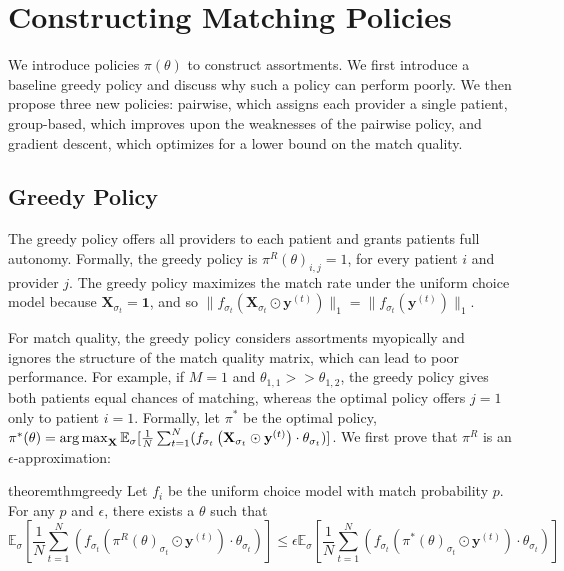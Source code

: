 \section{Constructing Matching Policies}
\label{sec:policies}
We introduce policies $\pi(\theta)$ to construct assortments. 
We first introduce a baseline greedy policy and discuss why such a policy can perform poorly. 
We then propose three new policies: pairwise, which assigns each provider a single patient, group-based, which improves upon the weaknesses of the pairwise policy, and gradient descent, which optimizes for a lower bound on the match quality. 

\subsection{Greedy Policy}
\label{sec:greedy}
The greedy policy offers all providers to each patient and grants patients full autonomy. 
Formally, the greedy policy is $\pi^{R}(\theta)_{i,j} = 1$, for every patient $i$ and provider $j$. 
The greedy policy maximizes the match rate under the uniform choice model because $\mathbf{X}_{\sigma_{t}} = \mathbf{1}$, and so $\lVert f_{\sigma_{t}}(\mathbf{X}_{\sigma_{t}} \odot \mathbf{y}^{(t)})\rVert_{1} = \lVert f_{\sigma_{t}}(\mathbf{y}^{(t)}) \rVert_{1}$.

For match quality, the greedy policy considers assortments myopically and ignores the structure of the match quality matrix, which can lead to poor performance. 
For example, if $M=1$ and $\theta_{1,1} >> \theta_{1,2}$, the greedy policy gives both patients equal chances of matching, whereas the optimal policy offers $j=1$ only to patient $i=1$. 
Formally, let $\pi^{*}$ be the optimal policy, $\pi^{*}(\theta) = \operatorname*{arg\,max}_{\mathbf{X}} \mathbb{E}_{\sigma}[\frac{1}{N} \sum_{t=1}^{N} (f_{\sigma_{t}}\left(\mathbf{X}_{\sigma_{t}} \odot \mathbf{y}^{(t)}\right)  \cdot \theta_{\sigma_{t}})]$. 
We first prove that $\pi^{R}$ is an $\epsilon$-approximation: 

\begin{restatable}{theorem}{thmgreedy}
    Let $f_{i}$ be the uniform choice model with match probability $p$. 
    For any $p$ and $\epsilon$, there exists a $\theta$ such that 
    \begin{equation}
        \mathbb{E}_{\sigma}[\frac{1}{N} \sum_{t=1}^{N} (f_{\sigma_{t}}\left(\pi^{R}(\theta)_{\sigma_{t}} \odot \mathbf{y}^{(t)}\right)  \cdot \theta_{\sigma_{t}})] \leq \epsilon \mathbb{E}_{\sigma}[\frac{1}{N} \sum_{t=1}^{N} (f_{\sigma_{t}}\left(\pi^{*}(\theta)_{\sigma_{t}} \odot \mathbf{y}^{(t)}\right)  \cdot \theta_{\sigma_{t}})]
    \end{equation}
\end{restatable}

